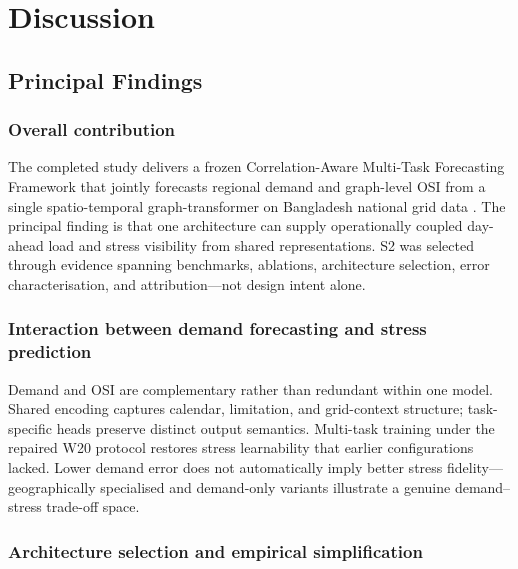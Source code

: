 \section{Discussion}\label{sec:discussion}

\subsection{Principal Findings}\label{subsection:principal_findings}

\subsubsection{Overall contribution}\label{subsubsection:overall_contribution}

The completed study delivers a frozen Correlation-Aware Multi-Task Forecasting Framework that jointly forecasts regional demand and graph-level OSI from a single spatio-temporal graph-transformer \cite{Vaswani2017Attention,Kipf2017GCN} on Bangladesh national grid data \cite{Hossain2025BangladeshSmartGrid}. The principal finding is that one architecture can supply operationally coupled day-ahead load and stress visibility from shared representations. S2 was selected through evidence spanning benchmarks, ablations, architecture selection, error characterisation, and attribution---not design intent alone.

\subsubsection{Interaction between demand forecasting and stress prediction}\label{subsubsection:interaction_between_demand_forecasting_and_stress_prediction}

Demand and OSI are complementary rather than redundant within one model. Shared encoding captures calendar, limitation, and grid-context structure; task-specific heads preserve distinct output semantics. Multi-task training \cite{Caruana1997Multitask,Song2024MultiTaskEnergy} under the repaired W20 protocol restores stress learnability that earlier configurations lacked. Lower demand error does not automatically imply better stress fidelity---geographically specialised and demand-only variants illustrate a genuine demand--stress trade-off space.

\subsubsection{Architecture selection and empirical simplification}\label{subsubsection:architecture_selection_and_empirical_simplification}

